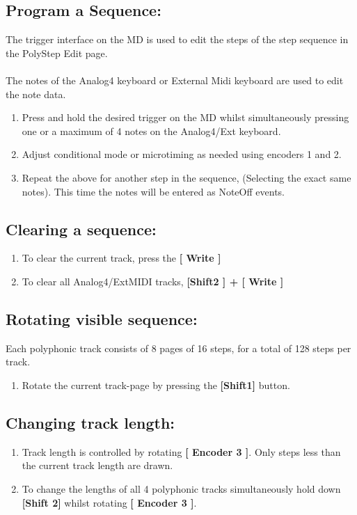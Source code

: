 \subsection{Program a Sequence: }
The trigger interface on the MD is used to edit the steps of the step sequence in the PolyStep Edit page.\\
\\
The notes of the Analog4 keyboard or External Midi keyboard are used to edit the note data.
\\
\begin{enumerate}
\item Press and hold the desired trigger on the MD whilst simultaneously pressing one or a maximum of 4 notes on the Analog4/Ext keyboard.
\item Adjust conditional mode or microtiming as needed using encoders 1 and 2.
\item Repeat the above for another step in the sequence, (Selecting the exact same notes). This time the notes will be entered as NoteOff events.
\end{enumerate}

\subsection{Clearing a sequence:}
\begin{enumerate}
\item To clear the current track, press the\textbf{ [ Write ] }
\item To clear all Analog4/ExtMIDI tracks, \textbf{[Shift2 ] + [ Write ]}
\end{enumerate}
\subsection{Rotating visible sequence:}
Each polyphonic track consists of 8 pages of 16 steps, for a total of 128 steps per track.
\begin{enumerate}
	\item Rotate the current track-page by pressing the \textbf{[Shift1] }button.
\end{enumerate}
\subsection{Changing track length:}
\begin{enumerate}
	\item Track length is controlled by rotating \textbf{[ Encoder 3 ]}. Only steps less than the current track length are drawn.
	\item To change the lengths of all 4 polyphonic tracks simultaneously hold down \textbf{[Shift 2]} whilst rotating \textbf{[ Encoder 3 ]}.
\end{enumerate}
